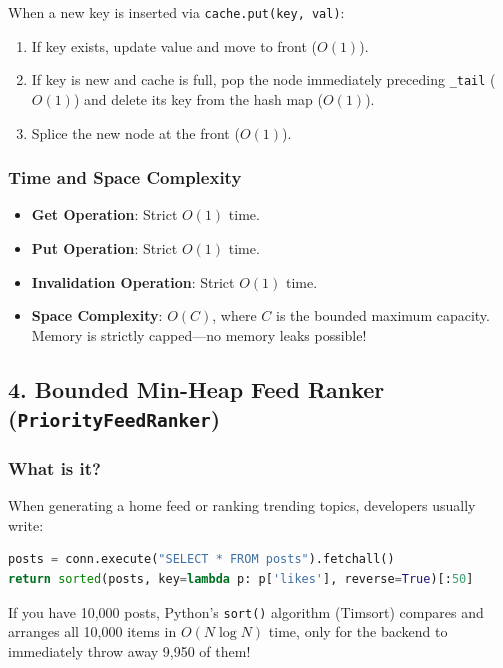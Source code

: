 \documentclass[11pt,a4paper]{article}
\begin{document}
When a new key is inserted via \texttt{cache.put(key, val)}:
\begin{enumerate}
    \item If key exists, update value and move to front ($O(1)$).
    \item If key is new and cache is full, pop the node immediately preceding \texttt{\_tail} ($O(1)$) and delete its key from the hash map ($O(1)$).
    \item Splice the new node at the front ($O(1)$).
\end{enumerate}

\subsubsection{Time and Space Complexity}
\begin{itemize}
    \item \textbf{Get Operation}: Strict $O(1)$ time.
    \item \textbf{Put Operation}: Strict $O(1)$ time.
    \item \textbf{Invalidation Operation}: Strict $O(1)$ time.
    \item \textbf{Space Complexity}: $O(C)$, where $C$ is the bounded maximum capacity. Memory is strictly capped—no memory leaks possible!
\end{itemize}

\subsection{4. Bounded Min-Heap Feed Ranker (\texttt{PriorityFeedRanker})}

\subsubsection{What is it?}
When generating a home feed or ranking trending topics, developers usually write:
\begin{lstlisting}[language=Python]
posts = conn.execute("SELECT * FROM posts").fetchall()
return sorted(posts, key=lambda p: p['likes'], reverse=True)[:50]
\end{lstlisting}
If you have 10,000 posts, Python's \texttt{sort()} algorithm (Timsort) compares and arranges all 10,000 items in $O(N \log N)$ time, only for the backend to immediately throw away 9,950 of them!
\end{document}
